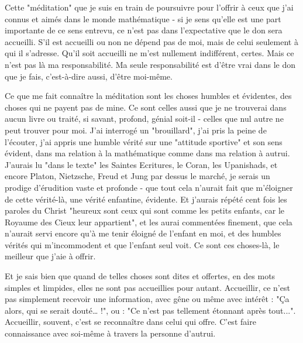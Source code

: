 Cette "méditation" que je suis en train de poursuivre pour l'offrir à ceux que j'ai connus et aimés dans le monde mathématique - si je sens qu'elle est une part importante de ce sens entrevu, ce n'est pas dans l'expectative que le don sera accueilli. S'il est accueilli ou non ne dépend pas de moi, mais de celui seulement à qui il s'adresse. Qu'il soit accueilli ne m'est nullement indifférent, certes. Mais ce n'est pas là ma responsabilité. Ma seule responsabilité est d’être vrai dans le don que je fais, c’est-à-dire aussi, d’être moi-même.

Ce que me fait connaître la méditation sont les choses humbles et évidentes, des choses qui ne payent pas de mine. Ce sont celles aussi que je ne trouverai dans aucun livre ou traité, si savant, profond, génial soit-il - celles que nul autre ne peut trouver pour moi. J'ai interrogé un "brouillard", j'ai pris la peine de l'écouter, j'ai appris une humble vérité sur une "attitude sportive" et son sens évident, dans ma relation à la mathématique comme dans ma relation à autrui. J'aurais lu "dans le texte" les Saintes Ecritures, le Coran, les Upanishads, et encore Platon, Nietzsche, Freud et Jung par dessus le marché, je serais un prodige d'érudition vaste et profonde - que tout cela n'aurait fait que m'éloigner de cette vérité-là, une vérité enfantine, évidente. Et j'aurais répété cent fois les paroles du Christ "heureux sont ceux qui sont comme les petits enfants, car le Royaume des Cieux leur appartient", et les aurai commentées finement, que cela n'aurait servi encore qu'à me tenir éloigné de l'enfant en moi, et des humbles vérités qui m'incommodent et que l'enfant seul voit. Ce sont ces choses-là, le meilleur que j’aie à offrir.

Et je sais bien que quand de telles choses sont dites et offertes, en des mots simples et limpides, elles ne sont pas accueillies pour autant. Accueillir, ce n'est pas simplement recevoir une information, avec gêne ou même avec intérêt : "Ça alors, qui se serait douté… !", ou : "Ce n'est pas tellement étonnant après tout...". Accueillir, souvent, c'est se reconnaître dans celui qui offre. C'est faire connaissance avec soi-même à travers la personne d'autrui.